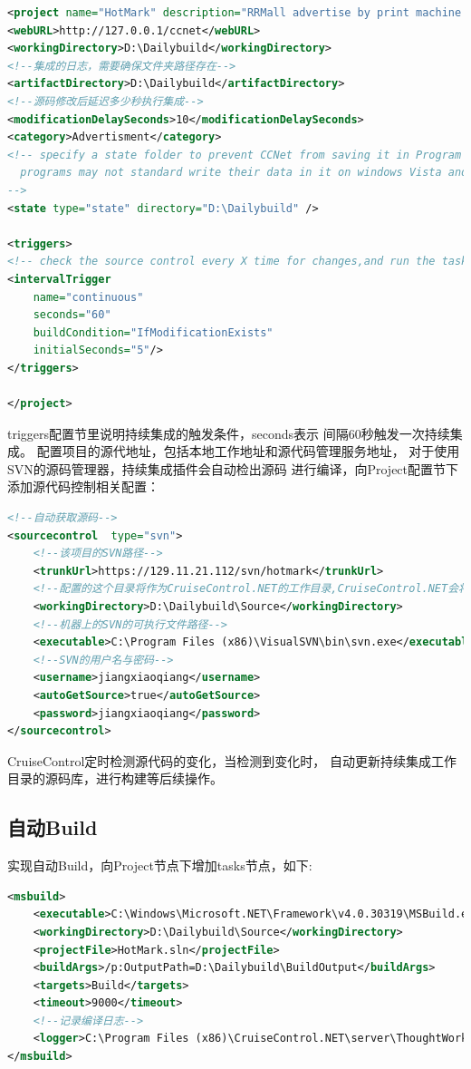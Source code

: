\documentclass{book}
\begin{document}
\begin{lstlisting}[language=XML]
<project name="HotMark" description="RRMall advertise by print machine." queue="Q1">
<webURL>http://127.0.0.1/ccnet</webURL>
<workingDirectory>D:\Dailybuild</workingDirectory>	
<!--集成的日志，需要确保文件夹路径存在-->
<artifactDirectory>D:\Dailybuild</artifactDirectory>	
<!--源码修改后延迟多少秒执行集成-->
<modificationDelaySeconds>10</modificationDelaySeconds>
<category>Advertisment</category>	
<!-- specify a state folder to prevent CCNet from saving it in Program Files\CruiseControl.NET\server 
  programs may not standard write their data in it on windows Vista and up)
-->
<state type="state" directory="D:\Dailybuild" /> 

<triggers>
<!-- check the source control every X time for changes,and run the tasks if changes are found -->
<intervalTrigger
	name="continuous"
	seconds="60"
	buildCondition="IfModificationExists"
	initialSeconds="5"/>
</triggers>

</project>
\end{lstlisting}

triggers配置节里说明持续集成的触发条件，seconds表示
间隔60秒触发一次持续集成。
配置项目的源代地址，包括本地工作地址和源代码管理服务地址，
对于使用SVN的源码管理器，持续集成插件会自动检出源码
进行编译，向Project配置节下添加源代码控制相关配置：

\begin{lstlisting}[language=XML]
<!--自动获取源码-->
<sourcecontrol 	type="svn">
	<!--该项目的SVN路径-->
    <trunkUrl>https://129.11.21.112/svn/hotmark</trunkUrl>  
    <!--配置的这个目录将作为CruiseControl.NET的工作目录,CruiseControl.NET会将代码从SVN中check out到这个目录中.-->
    <workingDirectory>D:\Dailybuild\Source</workingDirectory>  
    <!--机器上的SVN的可执行文件路径-->
    <executable>C:\Program Files (x86)\VisualSVN\bin\svn.exe</executable>  
    <!--SVN的用户名与密码-->
    <username>jiangxiaoqiang</username>
	<autoGetSource>true</autoGetSource>
    <password>jiangxiaoqiang</password>
</sourcecontrol>
\end{lstlisting}

CruiseControl定时检测源代码的变化，当检测到变化时，
自动更新持续集成工作目录的源码库，进行构建等后续操作。

\subsection{自动Build}

实现自动Build，向Project节点下增加tasks节点，如下:
\begin{lstlisting}[language=XML]
<msbuild>			 
	<executable>C:\Windows\Microsoft.NET\Framework\v4.0.30319\MSBuild.exe</executable>         
	<workingDirectory>D:\Dailybuild\Source</workingDirectory> 
	<projectFile>HotMark.sln</projectFile> 
	<buildArgs>/p:OutputPath=D:\Dailybuild\BuildOutput</buildArgs> 
	<targets>Build</targets> 
	<timeout>9000</timeout> 
	<!--记录编译日志-->
	<logger>C:\Program Files (x86)\CruiseControl.NET\server\ThoughtWorks.CruiseControl.MSBuild.dll</logger>       
</msbuild>
\end{lstlisting}
\end{document}
